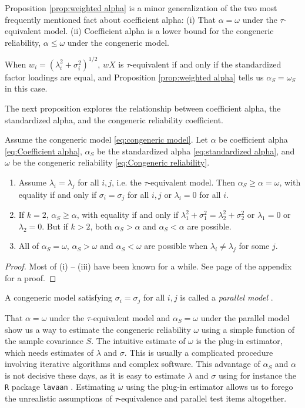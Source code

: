 \documentclass[twoside]{article}
\renewcommand{\sqrt}[1]{{(#1)^{1/2}}}
\begin{document}
Proposition \ref{prop:weighted alpha} is a minor generalization of the two most frequently mentioned fact about coefficient alpha: (i) That $\alpha = \omega$ under the $\tau$-equivalent model. (ii) Coefficient alpha is a lower bound for the congeneric reliability, $\alpha \leq \omega$ under the congeneric model.
 
When $w_{i}=\sqrt{\lambda_{i}^{2}+\sigma_{i}^{2}}$, $wX$ is $\tau$-equivalent if and only if the standardized factor loadings are equal, and Proposition \ref{prop:weighted alpha} tells us $\alpha_S = \omega_S$ in this case. 

The next proposition explores the relationship between coefficient alpha, the standardized alpha, and the congeneric reliability coefficient.

\begin{prop}
\label{prop:Reliabilities.}Assume the congeneric model \eqref{eq:congeneric model}. Let $\alpha$ be coefficient alpha \eqref{eq:Coefficient alpha}, $\alpha_S$ be the standardized alpha \eqref{eq:standardized alpha}, and  $\omega$ be the congeneric reliability \eqref{eq:Congeneric reliability}. 
\begin{enumerate}[label=(\roman*)]
\item Assume $\lambda_{i}=\lambda_{j}$ for all $i,j$, i.e. the $\tau$-equivalent model. Then $\alpha_S \geq \alpha = \omega$, with equality if and only if $\sigma_{i}=\sigma_{j}$ for all $i,j$ or $\lambda_i = 0$ for all $i$.
\item If $k=2$, $\alpha_S\geq\alpha$, with equality if and only if $\lambda_{1}^{2}+\sigma_{1}^{2}=\lambda_{2}^{2}+\sigma_{2}^{2}$ or $\lambda_1 = 0$ or $\lambda_2 = 0$. But if $k>2$, both $\alpha_S>\alpha$
and $\alpha_S<\alpha$ are possible.
\item All of $\alpha_S=\omega$, $\alpha_S>\omega$ and $\alpha_S<\omega$
are possible when $\lambda_{i}\neq\lambda_{j}$ for some $j$.
\end{enumerate}
\end{prop}
\begin{proof}
Most of (i) -- (iii) have been known for a while. See page \pageref{proof:Reliabilities.} of the appendix for a proof.
\end{proof}

A congeneric model satisfying $\sigma_{i}=\sigma_{j}$ for all $i,j$ is called a \emph{parallel model} \citep[][section 2.13]{Lord1968-ax}. 

That $\alpha = \omega$ under the $\tau$-equivalent model and $\alpha_S = \omega$ under the parallel model show us a way to estimate the congeneric reliability $\omega$ using a simple function of the sample covariance $S$. The intuitive estimate of $\omega$ is the plug-in estimator, which needs estimates of $\lambda$ and $\sigma$. This is usually a complicated procedure involving iterative algorithms and complex software. This advantage of $\alpha_S$ and $\alpha$ is not decisive these days, as it is easy to estimate $\lambda$ and $\sigma$ using for instance the \texttt{R} \citep{Team2013-tt} package \texttt{lavaan} \citep{Rosseel2012-yg}. Estimating $\omega$ using the plug-in estimator allows us to forego the unrealistic assumptions of $\tau$-equivalence and parallel test items altogether.
\end{document}
